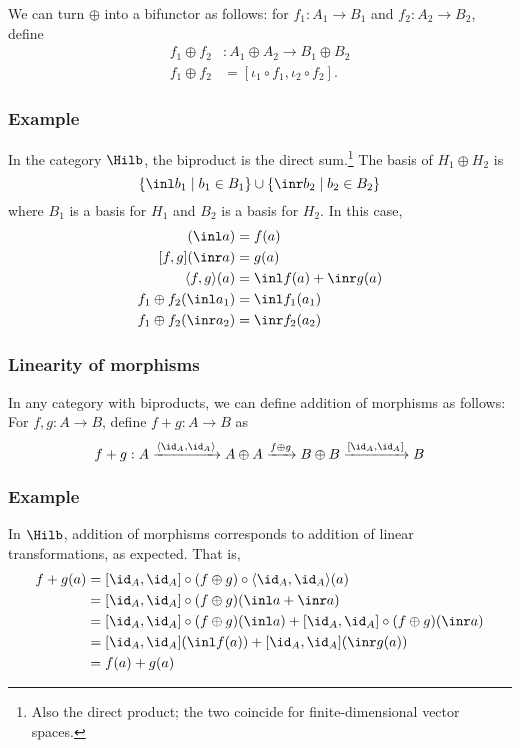 We can turn $\oplus$ into a bifunctor as follows: for $f_1:A_1 \rightarrow B_1$
and $f_2 : A_2 \rightarrow B_2$, define 
\begin{align*}
    f_1 \oplus f_2 &: A_1 \oplus A_2 \rightarrow B_1 \oplus B_2 \\
    f_1 \oplus f_2 &= [\iota_1 \circ f_1, \iota_2 \circ f_2].
\end{align*}

\subsubsection*{Example} In the category $\Hilb$, the 
biproduct is the direct sum.\footnote{Also the direct product; the two coincide
for finite-dimensional vector spaces.} The basis of $H_1 \oplus H_2$ is 
\[ \{\inl b_1 \mid b_1 \in B_1 \} \cup \{\inr b_2 \mid b_2 \in B_2 \} \]
where $B_1$ is a basis for $H_1$ and $B_2$ is a basis for $H_2$. In this case,
\begin{align*}
    [f,g](\inl a) &= f(a) \\
    [f,g](\inr a) &= g(a) \\
    \langle f,g \rangle (a) &= \inl f(a) + \inr g(a) \\
    f_1 \oplus f_2(\inl a_1) &= \inl f_1(a_1) \\
    f_1 \oplus f_2(\inr a_2) &= \inr f_2(a_2)
\end{align*}

\subsubsection*{Linearity of morphisms}

In any category with biproducts, we can define addition of morphisms as follows:
For $f, g : A \rightarrow B$, define $f + g : A \rightarrow B$ as
    \[ f + g : A
    \xrightarrow{\langle \id_A, \id_A \rangle}
    A \oplus A
    \xrightarrow{f \oplus g}
    B \oplus B  
    \xrightarrow{[\id_A,\id_A]}
    B
    \]
 \subsubsection*{Example} In $\Hilb$, addition of morphisms corresponds to addition of linear
transformations, as expected. That is,
\begin{align*}
    f+g(a)
    &= [\id_A,\id_A] \circ (f \oplus g) \circ \langle \id_A, \id_A \rangle (a) \\
    &= [\id_A,\id_A] \circ (f \oplus g) (\inl a + \inr a) \\
    &= [\id_A,\id_A] \circ (f \oplus g) (\inl a)
     + [\id_A,\id_A] \circ (f \oplus g) (\inr a) \\
    &= [\id_A,\id_A] (\inl f(a)) + [\id_A,\id_A] (\inr g(a)) \\
    &= f(a) + g(a)
\end{align*}

